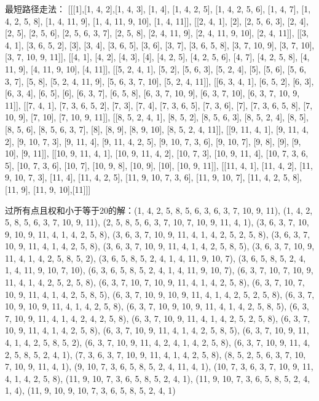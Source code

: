 \documentclass[12pt]{article}
\begin{document}
最短路径走法： [[[1],[1, 4, 2],[1, 4, 3], [1, 4], [1, 4, 2, 5], [1, 4, 2, 5, 6], [1, 4, 7], [1, 4, 2, 5, 8], [1, 4, 11, 9], [1, 4, 11, 9, 10], [1, 4, 11]], [[2, 4, 1], [2], [2, 5, 6, 3], [2, 4], [2, 5], [2, 5, 6], [2, 5, 6, 3, 7], [2, 5, 8], [2, 4, 11, 9], [2, 4, 11, 9, 10], [2, 4, 11]], [[3, 4, 1], [3, 6, 5, 2], [3], [3, 4], [3, 6, 5], [3, 6], [3, 7], [3, 6, 5, 8], [3, 7, 10, 9], [3, 7, 10], [3, 7, 10, 9, 11]], [[4, 1], [4, 2], [4, 3], [4], [4, 2, 5], [4, 2, 5, 6], [4, 7], [4, 2, 5, 8], [4, 11, 9], [4, 11, 9, 10], [4, 11]], [[5, 2, 4, 1], [5, 2], [5, 6, 3], [5, 2, 4], [5], [5, 6], [5, 6, 3, 7], [5, 8], [5, 2, 4, 11, 9], [5, 6, 3, 7, 10], [5, 2, 4, 11]], [[6, 3, 4, 1], [6, 5, 2], [6, 3], [6, 3, 4], [6, 5], [6], [6, 3, 7], [6, 5, 8], [6, 3, 7, 10, 9], [6, 3, 7, 10], [6, 3, 7, 10, 9, 11]], [[7, 4, 1], [7, 3, 6, 5, 2], [7, 3], [7, 4], [7, 3, 6, 5], [7, 3, 6], [7], [7, 3, 6, 5, 8], [7, 10, 9], [7, 10], [7, 10, 9, 11]], [[8, 5, 2, 4, 1], [8, 5, 2], [8, 5, 6, 3], [8, 5, 2, 4], [8, 5], [8, 5, 6], [8, 5, 6, 3, 7], [8], [8, 9], [8, 9, 10], [8, 5, 2, 4, 11]], [[9, 11, 4, 1], [9, 11, 4, 2], [9, 10, 7, 3], [9, 11, 4], [9, 11, 4, 2, 5], [9, 10, 7, 3, 6], [9, 10, 7], [9, 8], [9], [9, 10], [9, 11]], [[10, 9, 11, 4, 1], [10, 9, 11, 4, 2], [10, 7, 3], [10, 9, 11, 4], [10, 7, 3, 6, 5], [10, 7, 3, 6], [10, 7], [10, 9, 8], [10, 9], [10], [10, 9, 11]], [[11, 4, 1], [11, 4, 2], [11, 9, 10, 7, 3], [11, 4], [11, 4, 2, 5], [11, 9, 10, 7, 3, 6], [11, 9, 10, 7], [11, 4, 2, 5, 8], [11, 9], [11, 9, 10],[11]]]

过所有点且权和小于等于20的解：(1, 4, 2, 5, 8, 5, 6, 3, 6, 3, 7, 10, 9, 11), (1, 4, 2, 5, 8, 5, 6, 3, 7, 10, 9, 11), (2, 5, 8, 5, 6, 3, 7, 10, 7, 10, 9, 11, 4, 1), (3, 6, 3, 7, 10, 9, 10, 9, 11, 4, 1, 4, 2, 5, 8), (3, 6, 3, 7, 10, 9, 11, 4, 1, 4, 2, 5, 2, 5, 8), (3, 6, 3, 7, 10, 9, 11, 4, 1, 4, 2, 5, 8), (3, 6, 3, 7, 10, 9, 11, 4, 1, 4, 2, 5, 8, 5), (3, 6, 3, 7, 10, 9, 11, 4, 1, 4, 2, 5, 8, 5, 2), (3, 6, 5, 8, 5, 2, 4, 1, 4, 11, 9, 10, 7), (3, 6, 5, 8, 5, 2, 4, 1, 4, 11, 9, 10, 7, 10), (6, 3, 6, 5, 8, 5, 2, 4, 1, 4, 11, 9, 10, 7), (6, 3, 7, 10, 7, 10, 9, 11, 4, 1, 4, 2, 5, 2, 5, 8), (6, 3, 7, 10, 7, 10, 9, 11, 4, 1, 4, 2, 5, 8), (6, 3, 7, 10, 7, 10, 9, 11, 4, 1, 4, 2, 5, 8, 5), (6, 3, 7, 10, 9, 10, 9, 11, 4, 1, 4, 2, 5, 2, 5, 8), (6, 3, 7, 10, 9, 10, 9, 11, 4, 1, 4, 2, 5, 8), (6, 3, 7, 10, 9, 10, 9, 11, 4, 1, 4, 2, 5, 8, 5), (6, 3, 7, 10, 9, 11, 4, 1, 4, 2, 4, 2, 5, 8), (6, 3, 7, 10, 9, 11, 4, 1, 4, 2, 5, 2, 5, 8), (6, 3, 7, 10, 9, 11, 4, 1, 4, 2, 5, 8), (6, 3, 7, 10, 9, 11, 4, 1, 4, 2, 5, 8, 5), (6, 3, 7, 10, 9, 11, 4, 1, 4, 2, 5, 8, 5, 2), (6, 3, 7, 10, 9, 11, 4, 2, 4, 1, 4, 2, 5, 8), (6, 3, 7, 10, 9, 11, 4, 2, 5, 8, 5, 2, 4, 1), (7, 3, 6, 3, 7, 10, 9, 11, 4, 1, 4, 2, 5, 8), (8, 5, 2, 5, 6, 3, 7, 10, 7, 10, 9, 11, 4, 1), (9, 10, 7, 3, 6, 5, 8, 5, 2, 4, 11, 4, 1), (10, 7, 3, 6, 3, 7, 10, 9, 11, 4, 1, 4, 2, 5, 8), (11, 9, 10, 7, 3, 6, 5, 8, 5, 2, 4, 1), (11, 9, 10, 7, 3, 6, 5, 8, 5, 2, 4, 1, 4), (11, 9, 10, 9, 10, 7, 3, 6, 5, 8, 5, 2, 4, 1)
\end{document}
